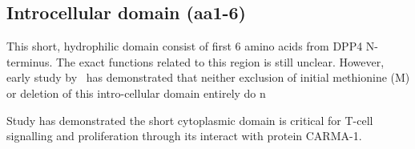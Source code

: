 \subsection{Introcellular domain (aa1-6)}

This short, hydrophilic domain consist of first 6 amino acids from DPP4 N-terminus. The exact functions related to this region is still unclear. However, early study by~\citet{Hong1990} has demonstrated that neither exclusion of initial methionine (M) or deletion of this intro-cellular domain entirely do  n

Study has demonstrated the short cytoplasmic domain is critical for T-cell signalling and proliferation through its interact with protein CARMA-1. \cite{Ohnuma_2007}